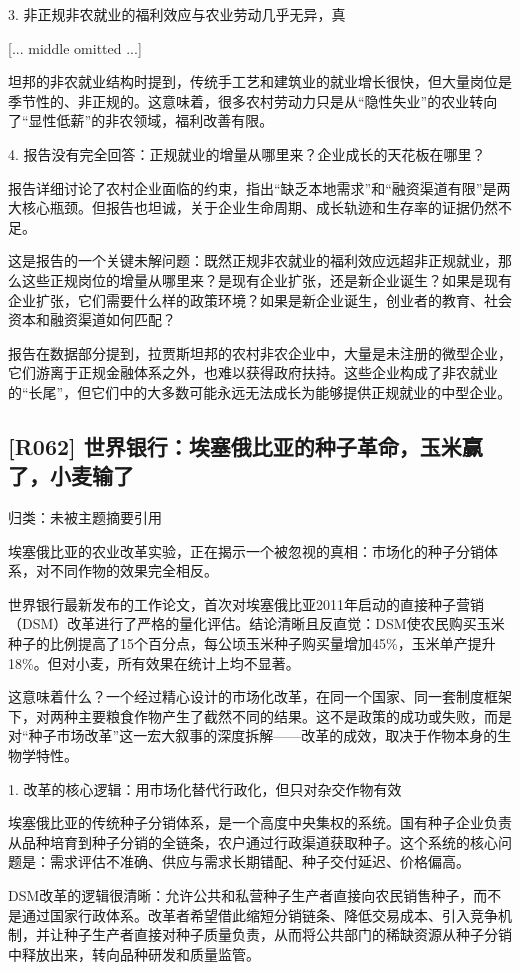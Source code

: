 \documentclass[11pt]{ctexart}
\begin{document}
3. 非正规非农就业的福利效应与农业劳动几乎无异，真

[... middle omitted ...]

坦邦的非农就业结构时提到，传统手工艺和建筑业的就业增长很快，但大量岗位是季节性的、非正规的。这意味着，很多农村劳动力只是从“隐性失业”的农业转向了“显性低薪”的非农领域，福利改善有限。

4. 报告没有完全回答：正规就业的增量从哪里来？企业成长的天花板在哪里？

报告详细讨论了农村企业面临的约束，指出“缺乏本地需求”和“融资渠道有限”是两大核心瓶颈。但报告也坦诚，关于企业生命周期、成长轨迹和生存率的证据仍然不足。

这是报告的一个关键未解问题：既然正规非农就业的福利效应远超非正规就业，那么这些正规岗位的增量从哪里来？是现有企业扩张，还是新企业诞生？如果是现有企业扩张，它们需要什么样的政策环境？如果是新企业诞生，创业者的教育、社会资本和融资渠道如何匹配？

报告在数据部分提到，拉贾斯坦邦的农村非农企业中，大量是未注册的微型企业，它们游离于正规金融体系之外，也难以获得政府扶持。这些企业构成了非农就业的“长尾”，但它们中的大多数可能永远无法成长为能够提供正规就业的中型企业。

\subsection{[R062] 世界银行：埃塞俄比亚的种子革命，玉米赢了，小麦输了}
{\small\color{refgray}归类：未被主题摘要引用}

埃塞俄比亚的农业改革实验，正在揭示一个被忽视的真相：市场化的种子分销体系，对不同作物的效果完全相反。

世界银行最新发布的工作论文，首次对埃塞俄比亚2011年启动的直接种子营销（DSM）改革进行了严格的量化评估。结论清晰且反直觉：DSM使农民购买玉米种子的比例提高了15个百分点，每公顷玉米种子购买量增加45\%，玉米单产提升18\%。但对小麦，所有效果在统计上均不显著。

这意味着什么？一个经过精心设计的市场化改革，在同一个国家、同一套制度框架下，对两种主要粮食作物产生了截然不同的结果。这不是政策的成功或失败，而是对“种子市场改革”这一宏大叙事的深度拆解——改革的成效，取决于作物本身的生物学特性。

1. 改革的核心逻辑：用市场化替代行政化，但只对杂交作物有效

埃塞俄比亚的传统种子分销体系，是一个高度中央集权的系统。国有种子企业负责从品种培育到种子分销的全链条，农户通过行政渠道获取种子。这个系统的核心问题是：需求评估不准确、供应与需求长期错配、种子交付延迟、价格偏高。

DSM改革的逻辑很清晰：允许公共和私营种子生产者直接向农民销售种子，而不是通过国家行政体系。改革者希望借此缩短分销链条、降低交易成本、引入竞争机制，并让种子生产者直接对种子质量负责，从而将公共部门的稀缺资源从种子分销中释放出来，转向品种研发和质量监管。
\end{document}
